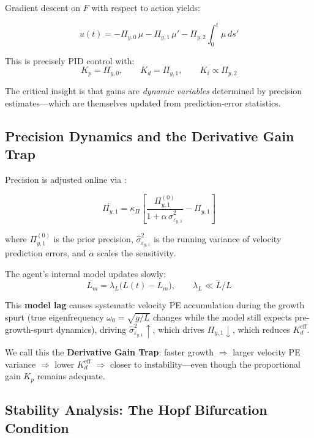 \documentclass[12pt, letterpaper]{article}
\newcommand{\Kd}{K_d}
\newcommand{\Kdeff}{K_d^{\mathrm{eff}}}
\newcommand{\Piy}{\Pi_{y,1}}
\newcommand{\epsy}{\varepsilon_{y,1}}
\newcommand{\Lm}{L_m}
\begin{document}
Gradient descent on $F$ with respect to action yields:

\begin{equation}
  u(t) = -\Pi_{y,0}\,\mu - \Piy\,\mu' - \Pi_{y,2}\!\int_{0}^{t}\!\mu\,ds'
  \label{eq:action}
\end{equation}

This is precisely PID control with:
\begin{equation}
  \boxed{K_p = \Pi_{y,0}, \qquad \Kd = \Piy, \qquad K_i \propto \Pi_{y,2}}
  \label{eq:PIDmap}
\end{equation}

The critical insight is that gains are \emph{dynamic variables} determined by
precision estimates---which are themselves updated from prediction-error
statistics.

\subsection{Precision Dynamics and the Derivative Gain Trap}

Precision is adjusted online via \citep{Mathys2011}:

\begin{equation}
  \dot{\Piy} = \kappa_\Pi
    \left[\frac{\Piy^{(0)}}{1 + \alpha\,\hat{\sigma}^{2}_{\epsy}} - \Piy\right]
  \label{eq:precdyn}
\end{equation}

where $\Piy^{(0)}$ is the prior precision, $\hat{\sigma}^{2}_{\epsy}$ is the
running variance of velocity prediction errors, and $\alpha$ scales the
sensitivity.

The agent's internal model updates slowly:
\begin{equation}
  \dot{\Lm} = \lambda_L\bigl(L(t) - \Lm\bigr), \qquad \lambda_L \ll \dot{L}/L
  \label{eq:Lmodel}
\end{equation}

This \textbf{model lag} causes systematic velocity PE accumulation during the
growth spurt (true eigenfrequency $\omega_0 = \sqrt{g/L}$ changes while the
model still expects pre-growth-spurt dynamics), driving
$\hat{\sigma}^{2}_{\epsy}\!\uparrow$, which drives $\Piy\!\downarrow$, which
reduces $\Kdeff$.

We call this the \textbf{Derivative Gain Trap}: faster growth $\Rightarrow$
larger velocity PE variance $\Rightarrow$ lower $\Kdeff$ $\Rightarrow$ closer
to instability---even though the proportional gain $K_p$ remains adequate.

\subsection{Stability Analysis: The Hopf Bifurcation Condition}
\end{document}
